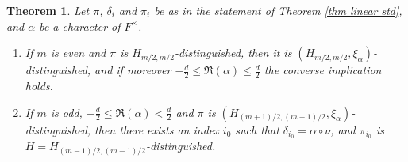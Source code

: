 \documentclass[11pt,letterpaper]{amsart}
\newcommand{\re}{\mathfrak{R}}
\def\d{\delta}
\theoremstyle{plain}
\newtheorem{thm}{Theorem}[section] \newtheorem{cor}[thm]{Corollary}
\numberwithin{equation}{section}
\begin{document}
\begin{thm}\label{thm chi linear std}
Let $\pi$, $\d_i$ and $\pi_i$ be as in the statement of Theorem \ref{thm linear std}, and $\alpha$ be a character of $F^\times$. 
\begin{enumerate}
\item\label{u} If $m$ is even and $\pi$ is $H_{m/2,m/2}$-distinguished, then it is $(H_{m/2,m/2},\xi_{\alpha})$-distinguished, and if moreover 
$-\frac{d}{2}\leq \re(\alpha) \leq \frac{d}{2}$ the converse implication holds. 
\item\label{v} If $m$ is odd, $-\frac{d}{2}\leq \re(\alpha)< \frac{d}{2}$ and $\pi$ is $(H_{(m+1)/2,(m-1)/2},\xi_{\alpha})$-distinguished, then there exists an index $i_0$ such that $\d_{i_0}=\alpha\circ \nu$, and $\pi_{i_0}$ is $H=H_{(m-1)/2,(m-1)/2}$-distinguished. 
\end{enumerate}
\end{thm}
\end{document}
